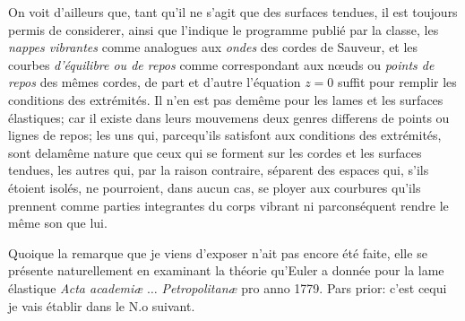 \documentclass[11pt,a4paper]{article}
\begin{document}
On voit d'ailleurs que, tant qu'il ne s'agit que des surfaces
tendues, il est toujours permis de considerer,  ainsi que
l'indique le programme publié par la classe, les \emph{nappes
vibrantes} comme analogues aux \emph{ondes} des cordes de Sauveur,
et les courbes \emph{d'équilibre ou de repos} comme correspondant
aux nœuds ou \emph{points de repos} des mêmes cordes,   de
part et d'autre l'équation $z = 0$ suffit pour remplir
les conditions des extrémités. Il n'en est pas demême
pour les lames et les surfaces élastiques; car il existe
dans leurs mouvemens deux genres differens de points ou
lignes de repos; les uns qui, parcequ'ils satisfont aux
conditions des extrémités, sont delamême nature que ceux
qui se forment sur les cordes et les surfaces tendues,
les autres qui, par la raison contraire, séparent des
espaces qui,  s'ils étoient isolés, ne pourroient, dans
aucun cas, se ployer aux courbures qu'ils prennent
comme parties integrantes du corps vibrant ni parconséquent
rendre le même son que lui.

Quoique la remarque que je viens d'exposer n'ait pas
encore été faite, elle se présente naturellement en
examinant la théorie qu'Euler a donnée pour la lame
élastique \emph{Acta academiæ} $\ldots$ \emph{Petropolitanæ} pro anno 1779. Pars prior:
c'est cequi je vais établir dans le N.o suivant.
\end{document}
